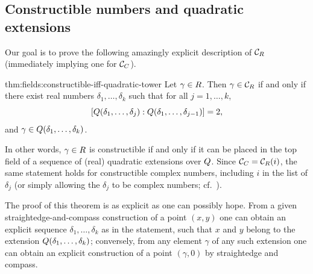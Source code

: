 \subsection{Constructible numbers and quadratic extensions}%
\label{subsec:fields:constructible-numbers-and-quadratic-extensions}
Our goal is to prove the following amazingly explicit description of
$\mathcal{C}_{R}$ (immediately implying one for $\mathcal{C}_{C}$).
\begin{thm}{}{thm:fields:constructible-iff-quadratic-tower}
  Let $\gamma \in R$. Then $\gamma \in \mathcal{C}_{R}$ if and only
  if there exist real numbers $\delta_1, \dots, \delta_k$ such that
  for all $j = 1, \dots, k$,
  \[ [Q(\delta_1, \dots, \delta_j) : Q(\delta_1, \dots,
    \delta_{j-1})]
    = 2,
  \]
  and $\gamma \in Q(\delta_1, \dots, \delta_k)$.

  In other words, $\gamma \in R$ is constructible if and only if it
  can be placed in the top field of a sequence of (real) quadratic
  extensions over $Q$. Since
  $\mathcal{C}_{C} = \mathcal{C}_{R}(i)$, the same statement holds
  for constructible complex numbers, including $i$ in the list of
  $\delta_j$ (or simply allowing the $\delta_j$ to be complex numbers;
  cf.\
  ).
\end{thm}
The proof of this theorem is as explicit as one can possibly
hope. From a given straightedge-and-compass construction of a point
$(x,y)$ one can obtain an explicit sequence
$\delta_1, \dots, \delta_k$ as in the statement, such that $x$ and $y$
belong to the extension $Q(\delta_1, \dots, \delta_k)$; conversely,
from any element $\gamma$ of any such extension one can obtain an
explicit construction of a point $(\gamma, 0)$ by straightedge and
compass.
